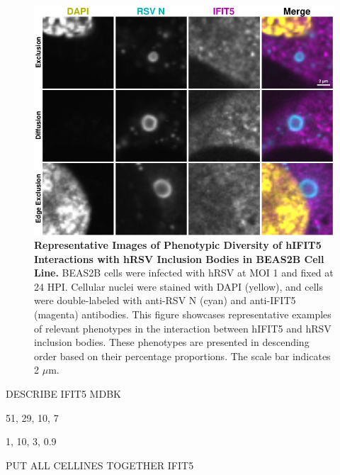 \begin{figure}
    \centering
    \includegraphics[width=1\linewidth]{08. Chapter 3/Figs/02. Infection/04. IFIT5/06. beas2b i5.pdf}
    \caption[Representative Images of Phenotypic Diversity of hIFIT5 Interactions with hRSV Inclusion Bodies in BEAS2B Cell Line.]{\textbf{Representative Images of Phenotypic Diversity of hIFIT5 Interactions with hRSV Inclusion Bodies in BEAS2B Cell Line.} BEAS2B cells were infected with hRSV at MOI 1 and fixed at 24 HPI. Cellular nuclei were stained with DAPI (yellow), and cells were double-labeled with anti-RSV N (cyan) and anti-IFIT5 (magenta) antibodies. This figure showcases representative examples of relevant phenotypes in the interaction between hIFIT5 and hRSV inclusion bodies. These phenotypes are presented in descending order based on their percentage proportions. The scale bar indicates 2 \(\mu \mbox{m}\).}
    \label{fig:Representative Images of Phenotypic Diversity of hIFIT5 Interactions with hRSV Inclusion Bodies in BEAS2B Cell Line}
\end{figure}

DESCRIBE IFIT5 MDBK

51, 29, 10, 7

1, 10, 3, 0.9

PUT ALL CELLINES TOGETHER IFIT5

